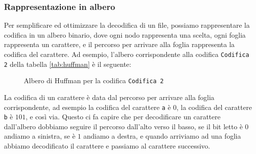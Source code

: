         \subsubsection{Rappresentazione in albero} 
            Per semplificare ed ottimizzare la decodifica di un file, possiamo rappresentare la codifica in un albero binario, dove ogni nodo rappresenta una scelta, ogni foglia rappresenta un carattere, e il percorso per arrivare alla foglia rappresenta la codifica del carattere. Ad esempio, l'albero corrispondente alla codifica \texttt{Codifica 2} della tabella \ref{tab:huffman} è il seguente:
            \begin{figure}[H]
                \centering
                \caption{Albero di Huffman per la codifica \texttt{Codifica 2}}
                \label{fig:huffman}
            \end{figure}
            La codifica di un carattere è data dal percorso per arrivare alla foglia corrispondente, ad esempio la codifica del carattere \texttt{a} è $0$, la codifica del carattere \texttt{b} è $101$, e così via.\newline
            Questo ci fa capire che per decodificare un carattere dall'albero dobbiamo seguire il percorso dall'alto verso il basso, se il bit letto è $0$ andiamo a sinistra, se è $1$ andiamo a destra, e quando arriviamo ad una foglia abbiamo decodificato il carattere e passiamo al carattere successivo.

